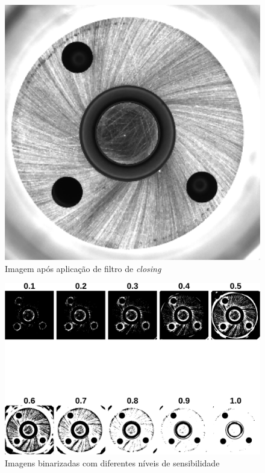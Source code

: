 \documentclass[conference]{IEEEtran}
\begin{document}
\begin{figure}[h]
	\centering
	\includegraphics[scale=0.18]{Images/Image0000_closed.png}
	\caption{Imagem após aplicação de filtro de \textit{closing}}
	\label{fig:imClosed}
\end{figure}

\begin{figure}[h]
	\centering
	\includegraphics[scale=0.65]{Images/Image0000_sensitivity.png}
	\caption{Imagens binarizadas com diferentes níveis de sensibilidade}
	\label{fig:sensivities}
\end{figure}
\end{document}

